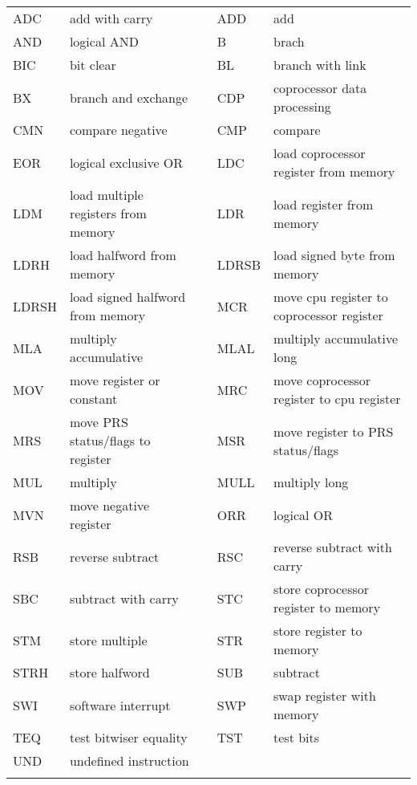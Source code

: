 \ttfamily
\small
\begin{tabular}{|m{1cm}|m{5.1cm}|p{1px}|m{1cm}|m{5.7cm}|}
	\hhline{--~--}
	ADC	& add with carry &&	ADD	& add \\
	\hhline{--~--}
	AND	& logical AND &&	B	& brach \\
	\hhline{--~--}
	BIC	& bit clear &&	BL	& branch with link \\
	\hhline{--~--}
	BX	& branch and exchange &&	CDP	& coprocessor data processing \\
	\hhline{--~--}
	CMN & compare negative &&	CMP & compare \\
	\hhline{--~--}
	EOR	& logical exclusive OR &&	LDC	& load coprocessor register from memory \\
	\hhline{--~--}
	LDM	& load multiple registers from memory && 	LDR	& load register from memory \\
	\hhline{--~--}
	LDRH	& load halfword from memory &&	LDRSB	& load signed byte from memory \\
	\hhline{--~--}
	LDRSH	& load signed halfword from memory && 	MCR	& move cpu register to coprocessor register \\
	\hhline{--~--}
	MLA	& multiply accumulative &&	MLAL & multiply accumulative long \\
	\hhline{--~--}
	MOV	& move register or constant &&	MRC	& move coprocessor register to cpu register \\
	\hhline{--~--}
	MRS	& move PRS status/flags to register &&	MSR	& move register to PRS status/flags \\
	\hhline{--~--}
	MUL	& multiply &&	MULL & multiply long \\
	\hhline{--~--}
	MVN	& move negative register &&	ORR	& logical OR \\
	\hhline{--~--}
	RSB	& reverse subtract &&	RSC	& reverse subtract with carry \\
	\hhline{--~--}
	SBC	& subtract with carry &&	STC	& store coprocessor register to memory \\
	\hhline{--~--}
	STM	& store multiple &&	STR	& store register to memory \\
	\hhline{--~--}
	STRH & store halfword &&	SUB	& subtract \\
	\hhline{--~--}
	SWI	& software interrupt &&	SWP	& swap register with memory \\
	\hhline{--~--}
	TEQ	& test bitwiser equality &&	TST	& test bits \\
	\hhline{--~--}
	UND	& undefined instruction & \multicolumn{3}{c}{} \\
	\hhline{--~~}
\end{tabular}
